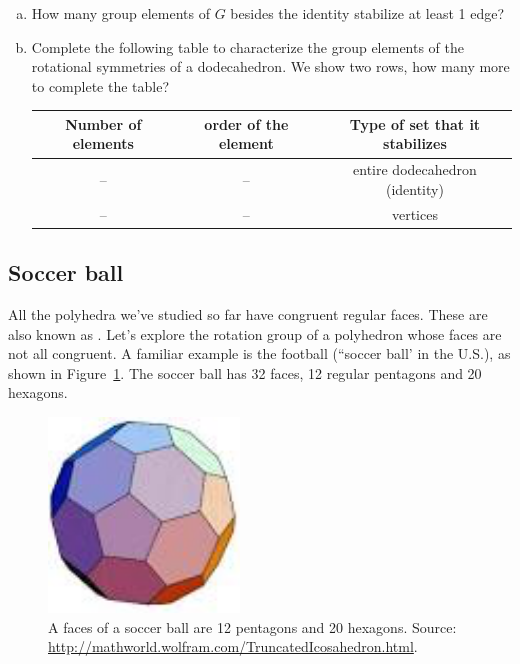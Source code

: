 \begin{exercise}\label{exercise:actions:Dodeca6} 
\begin{enumerate}[(a)]
\item How many group elements of $G$ besides the identity stabilize at least 1 edge?
\item
Complete the following table to characterize the group elements of the rotational symmetries of a dodecahedron.  We show two rows, how many more to complete the table?  

\begin{tabular}{ |c |  c | c |}\hline
  Number of elements & order of the element & Type of set that it stabilizes \\ \hline
  --&  --& entire  dodecahedron (identity) \\ \hline
  -- & --&  vertices \\ 
\end{tabular}
\end{enumerate}
\end{exercise}

\subsection{Soccer ball}
All the polyhedra we've studied so far have congruent regular faces.  These are also known as .  Let's explore the rotation group of a polyhedron whose faces are not all congruent.  A familiar example is the football (``soccer ball' in the U.S.), as shown in  Figure~\ref{fig:Soccer}.  The soccer ball has 32 faces, 12 regular pentagons and 20 hexagons.  

\begin{figure}[ht]
\begin{center}
\includegraphics[width=2in]{images/Soccerball.png}
\caption{A faces of a soccer ball are 12 pentagons and 20 hexagons.  Source: \url{http://mathworld.wolfram.com/TruncatedIcosahedron.html}.
}
\label{fig:Soccer}
\end{center}
\end{figure}


